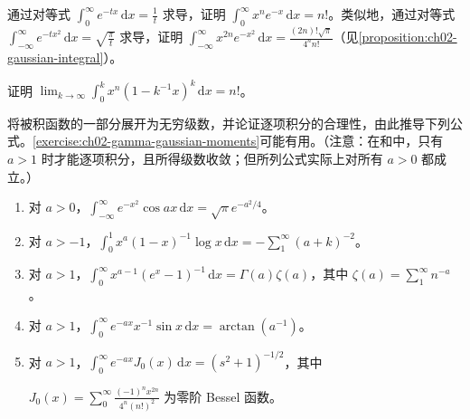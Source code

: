 \documentclass[../../main.tex]{subfiles}%
\begin{document}
\begin{exercise}\label{exercise:ch02-gamma-gaussian-moments}
通过对等式 $\int_0^\infty e^{-tx}\,\mathrm{d}x=\frac1t$ 求导，证明 $\int_0^\infty x^ne^{-x}\,\mathrm{d}x=n!$。类似地，通过对等式 $\int_{-\infty}^\infty e^{-tx^2}\,\mathrm{d}x=\sqrt{\frac\pi t}$ 求导，证明 $\int_{-\infty}^\infty x^{2n}e^{-x^2}\,\mathrm{d}x=\frac{(2n)!\sqrt\pi}{4^n n!}$（见\cref{proposition:ch02-gaussian-integral}）。
\end{exercise}
\begin{exercise}\label{exercise:ch02-factorial-limit}
证明 $\displaystyle\lim_{k\to\infty}\int_0^k x^n(1-k^{-1}x)^k\,\mathrm{d}x=n!$。
\end{exercise}
\begin{exercise}\label{exercise:ch02-termwise-integrals}
将被积函数的一部分展开为无穷级数，并论证逐项积分的合理性，由此推导下列公式。\cref{exercise:ch02-gamma-gaussian-moments}可能有用。（注意：在和中，只有 $a>1$ 时才能逐项积分，且所得级数收敛；但所列公式实际上对所有 $a>0$ 都成立。）
\begin{enumerate}
\item\label{item:ch02-gaussian-cosine} 对 $a>0$，$\int_{-\infty}^\infty e^{-x^2}\cos ax\,\mathrm{d}x=\sqrt\pi e^{-a^2/4}$。
\item\label{item:ch02-log-power-integral} 对 $a>-1$，$\int_0^1x^a(1-x)^{-1}\log x\,\mathrm{d}x=-\sum_1^\infty(a+k)^{-2}$。
\item\label{item:ch02-gamma-zeta-integral} 对 $a>1$，$\int_0^\infty x^{a-1}(e^x-1)^{-1}\,\mathrm{d}x=\Gamma(a)\zeta(a)$，其中 $\zeta(a)=\sum_1^\infty n^{-a}$。
\item\label{item:ch02-laplace-sine} 对 $a>1$，$\int_0^\infty e^{-ax}x^{-1}\sin x\,\mathrm{d}x=\arctan(a^{-1})$。
\item\label{item:ch02-laplace-bessel} 对 $a>1$，$\int_0^\infty e^{-ax}J_0(x)\,\mathrm{d}x=(s^2+1)^{-1/2}$，其中
\begin{definition*}[零阶 Bessel 函数]
$\displaystyle J_0(x)=\sum_0^\infty\frac{(-1)^n x^{2n}}{4^n(n!)^2}$ 为零阶 Bessel 函数。
\end{definition*}
\end{enumerate}
\end{exercise}
\end{document}
